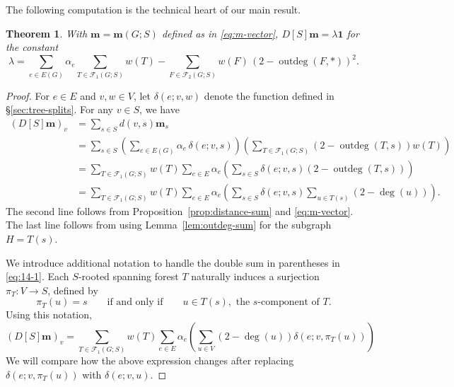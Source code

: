 \documentclass[12pt]{amsart}
\newtheorem{thm}{Theorem}[section]
\theoremstyle{definition}
\newcommand{\bone}{\mathbf{1}}
\newcommand{\boldm}{\mathbf{m}}
\newcommand{\trees}{\mathcal{F}_1}
\newcommand{\forests}{\mathcal{F}}
\DeclareMathOperator{\outdeg}{outdeg}
\begin{document}
The following computation is the technical heart of our main result.

\begin{thm}
\label{thm:m-distance-product}
With $\boldm = \boldm(G;S)$ defined as in \eqref{eq:m-vector},
$D[S] \boldm = \lambda \bone$
for the constant
\begin{equation}
\label{eq:lambda}
	\lambda = \sum_{e \in E(G)} \alpha_e \sum_{T\in \trees(G;S)} w({T}) - \sum_{F \in \forests_2(G;S)} w({F}) \, (2 - \outdeg(F,*))^2.
\end{equation}
\end{thm}

\begin{proof}
For $e\in E$ and $v,w\in V$, let $\delta(e;v,w)$ denote the function defined in \S\ref{sec:tree-splits}.
For any $v \in S$, we have
\begin{align}
  (D[S] \boldm)_v &= \sum_{s \in S} d(v,s) \boldm_s \\
  &= \sum_{s \in S} \left( \sum_{e \in E(G)} \alpha_e\, \delta(e; v,s) \right) \left( \sum_{T \in \trees(G;S)} (2 - \outdeg(T,s)) w({T}) \right) \\
  &= \sum_{T\in \trees(G;S)} w({T}) \sum_{e\in E} \alpha_e \left( \sum_{s \in S} \delta(e; v,s) (2 - \outdeg(T, s)) \right) \\
  &= \sum_{T \in \trees(G;S)} w({T}) \sum_{e \in E} \alpha_e \left( \sum_{s \in S} \delta(e; v,s) \sum_{u \in T(s)} (2 - \deg(u)) \right). \label{eq:14-1}
\end{align}
The second line follows from Proposition~\ref{prop:distance-sum} and \eqref{eq:m-vector}. 
The last line follows from using Lemma~\ref{lem:outdeg-sum} for the subgraph $H = T(s)$.

We introduce additional notation to handle the double sum in parentheses in \eqref{eq:14-1}.
Each $S$-rooted spanning forest $T$ naturally induces a surjection $\pi_T\colon V \to S$, defined by 
\[
	\pi_T(u) = s \qquad\text{if and only if}\qquad u \in T(s), \text{ the $s$-component of $T$}.
\]
Using this notation,
\begin{equation}
\label{eq:9}
	(D[S] \boldm)_v = \sum_{T \in \trees(G;S)} w({T}) \sum_{e \in E} \alpha_e \left( \sum_{u \in V} (2 - \deg(u)) \delta(e; v,\pi_T(u)) \right)
\end{equation}
We will compare how the above expression changes after replacing $\delta(e; v,\pi_T(u))$ with $\delta(e; v, u)$.


\end{proof}
\end{document}
